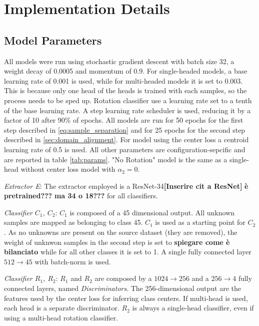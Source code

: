 \documentclass[10pt,twocolumn,letterpaper]{article}
\begin{document}
\section{Implementation Details}
\label{sec:implementation_details}
\subsection{Model Parameters}
\label{sec:model_parameters}

All models were run using stochastic gradient descent with batch size 32,
a weight decay of 0.0005 and momentum of 0.9.
For single-headed models, 
a base learning rate of 0.001 is used,
while for multi-headed models it is set to 0.003.
This is because only one head of the heads is trained with each samples,
so the process needs to be sped up.
Rotation classifier use a learning rate set to a tenth of the base learning rate.
A step learning rate scheduler is used, reducing it by a factor of 10 after 90\% of epochs.
All models are run for 50 epochs for the first step described in \ref{eq:sample_separation} and for 25 epochs for the second step described in \ref{sec:domain_alignment}.
For model using the center loss a centroid learning rate of 0.5 is used.
All other parameters are configuration-sepcific and are reported in table \ref{tab:params}.
"No Rotation" model is the same as a single-head without center loss model with $\alpha_2 = 0$.



{\it Extractor E}: The extractor employed is a ResNet-34{\bf[Inserire cit a ResNet]} {\bf è pretrained???} {\bf ma 34 o 18???} for all classifiers.

{\it Classifier $C_1$, $C_2$}: $C_1$ is composed of a 45 dimensional output. 
All unknown samples are mapped as belonging to class 45.
$C_1$ is used as a starting point for $C_2$.
As no unknowns are present on the source dataset (they are removed),
the weight of unknwon samples in the second step is set to {\bf spiegare come è bilanciato} while for all other classes it is set to 1.
A single fully connected layer $512\to 45$ with batch-norm is used.

{\it Classifier $R_1$, $R_2$}: 
$R_1$ and $R_2$ are composed by a $1024\to 256$  and a $256\to 4$ fully connected layers, named {\it Discriminators}.
The 256-dimensional output are the features used by the center loss for inferring class centers.
If multi-head is used, each head is a separate discriminator.
$R_2$ is always a single-head classifier, even if using a multi-head rotation classifier.
\end{document}

